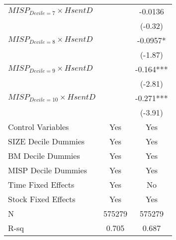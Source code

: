\begin{tabular}{lcc}
$MISP_{Decile = 7} \times HsentD$ &         & -0.0136 \\
        &         & (-0.32) \\
$MISP_{Decile = 8} \times HsentD$ &         & -0.0957* \\
        &         & (-1.87) \\
$MISP_{Decile = 9} \times HsentD$ &         & -0.164*** \\
        &         & (-2.81) \\
$MISP_{Decile = 10} \times HsentD$ &         & -0.271*** \\
        &         & (-3.91) \\
\midrule
Control Variables & Yes     & Yes \\
SIZE Decile Dummies & Yes     & Yes \\
BM Decile Dummies & Yes     & Yes \\
MISP Decile Dummies & Yes     & Yes \\
Time Fixed Effects & Yes     & No \\
Stock Fixed Effects & Yes     & Yes \\
N       & 575279  & 575279 \\
R-sq    & 0.705   & 0.687 \\
\bottomrule
\end{tabular}%
